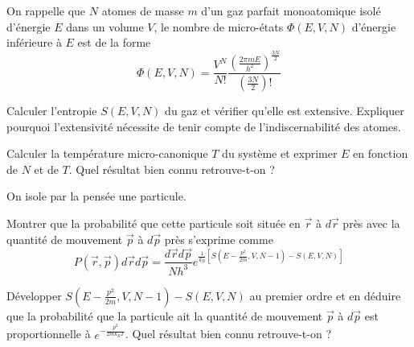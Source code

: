 On rappelle que $N$ atomes de masse $m$ d'un gaz parfait monoatomique isolé d'énergie $E$ dans un volume $V$, le nombre de micro-états $\Phi(E,V,N)$  d'énergie inférieure à $E$ est de la forme
$$
\Phi(E, V, N)= \frac{V^N}{N!}\frac{(\frac{2\pi m E}{h^2})^{\frac{3N}{2}}}{(\frac{3N}{2})!}
$$

\question
Calculer l'entropie $S(E,V,N)$ du gaz et vérifier qu'elle est extensive. Expliquer pourquoi l'extensivité nécessite de tenir compte de l'indiscernabilité des atomes.

\question
Calculer la température micro-canonique $T$ du système et exprimer $E$ en fonction de $N$ et de $T$. Quel résultat bien connu retrouve-t-on ?

On isole par la pensée une particule. 

\question
Montrer que la probabilité que cette particule soit située en $\vec r$ à $d\vec r$ près avec la quantité de mouvement $\vec p$ à $d\vec p$ près s'exprime comme
$$
P(\vec r,\vec p)d\vec r d\vec p=\frac{d\vec r d\vec p}{N h^3} e^{\frac{1}{k_B}\left[S(E-\frac{p^2}{2m},V,N-1)-S(E,V,N) \right]}
$$

\question
Développer $S(E-\frac{p^2}{2m},V,N-1)-S(E,V,N)$ au premier ordre et en déduire que la probabilité que la particule ait la quantité de mouvement $\vec p$ à $d\vec p$ est proportionnelle à $e^{-\frac{p^2}{2mk_BT}}$. Quel résultat bien connu retrouve-t-on ?
